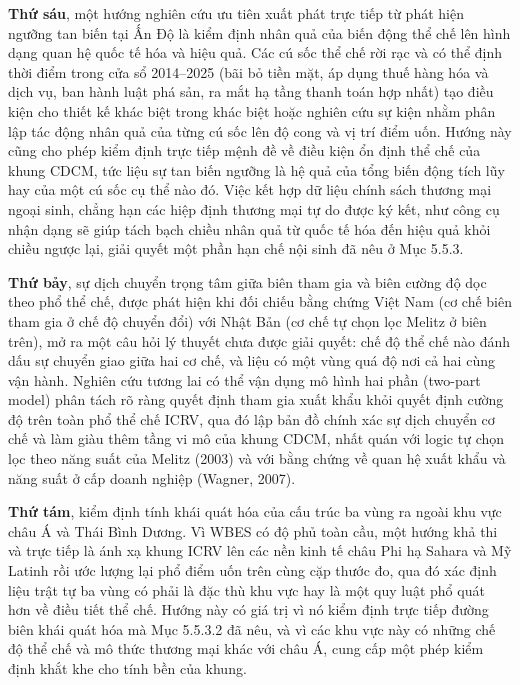 \documentclass[
  a4paper,
  13pt]{extreport}
\begin{document}
\textbf{Thứ sáu}, một hướng nghiên cứu ưu tiên xuất phát trực tiếp từ
phát hiện ngưỡng tan biến tại Ấn Độ là kiểm định nhân quả của biến động
thể chế lên hình dạng quan hệ quốc tế hóa và hiệu quả. Các cú sốc thể
chế rời rạc và có thể định thời điểm trong cửa sổ 2014--2025 (bãi bỏ
tiền mặt, áp dụng thuế hàng hóa và dịch vụ, ban hành luật phá sản, ra
mắt hạ tầng thanh toán hợp nhất) tạo điều kiện cho thiết kế khác biệt
trong khác biệt hoặc nghiên cứu sự kiện nhằm phân lập tác động nhân quả
của từng cú sốc lên độ cong và vị trí điểm uốn. Hướng này cũng cho phép
kiểm định trực tiếp mệnh đề về điều kiện ổn định thể chế của khung CDCM,
tức liệu sự tan biến ngưỡng là hệ quả của tổng biến động tích lũy hay
của một cú sốc cụ thể nào đó. Việc kết hợp dữ liệu chính sách thương mại
ngoại sinh, chẳng hạn các hiệp định thương mại tự do được ký kết, như
công cụ nhận dạng sẽ giúp tách bạch chiều nhân quả từ quốc tế hóa đến
hiệu quả khỏi chiều ngược lại, giải quyết một phần hạn chế nội sinh đã
nêu ở Mục 5.5.3.

\textbf{Thứ bảy}, sự dịch chuyển trọng tâm giữa biên tham gia và biên
cường độ dọc theo phổ thể chế, được phát hiện khi đối chiếu bằng chứng
Việt Nam (cơ chế biên tham gia ở chế độ chuyển đổi) với Nhật Bản (cơ chế
tự chọn lọc Melitz ở biên trên), mở ra một câu hỏi lý thuyết chưa được
giải quyết: chế độ thể chế nào đánh dấu sự chuyển giao giữa hai cơ chế,
và liệu có một vùng quá độ nơi cả hai cùng vận hành. Nghiên cứu tương
lai có thể vận dụng mô hình hai phần (two-part model) phân tách rõ ràng
quyết định tham gia xuất khẩu khỏi quyết định cường độ trên toàn phổ thể
chế ICRV, qua đó lập bản đồ chính xác sự dịch chuyển cơ chế và làm giàu
thêm tầng vi mô của khung CDCM, nhất quán với logic tự chọn lọc theo
năng suất của Melitz (2003) và với bằng chứng về quan hệ xuất khẩu và
năng suất ở cấp doanh nghiệp (Wagner, 2007).

\textbf{Thứ tám}, kiểm định tính khái quát hóa của cấu trúc ba vùng ra
ngoài khu vực châu Á và Thái Bình Dương. Vì WBES có độ phủ toàn cầu, một
hướng khả thi và trực tiếp là ánh xạ khung ICRV lên các nền kinh tế châu
Phi hạ Sahara và Mỹ Latinh rồi ước lượng lại phổ điểm uốn trên cùng cặp
thước đo, qua đó xác định liệu trật tự ba vùng có phải là đặc thù khu
vực hay là một quy luật phổ quát hơn về điều tiết thể chế. Hướng này có
giá trị vì nó kiểm định trực tiếp đường biên khái quát hóa mà Mục
5.5.3.2 đã nêu, và vì các khu vực này có những chế độ thể chế và mô thức
thương mại khác với châu Á, cung cấp một phép kiểm định khắt khe cho
tính bền của khung.
\end{document}

